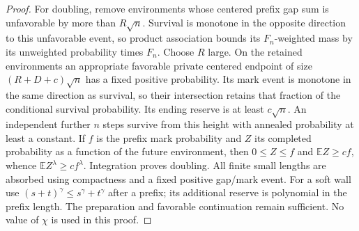 \begin{proof}
For doubling, remove environments whose centered prefix gap sum is
unfavorable by more than $R\sqrt n$. Survival is monotone in the opposite
direction to this unfavorable event, so product association bounds its
$F_n$-weighted mass by its unweighted probability times $F_n$.
Choose $R$ large. On the retained environments an appropriate favorable
private centered endpoint of size $(R+D+c)\sqrt n$ has a fixed positive
probability. Its mark event is monotone in the same direction as survival,
so their intersection retains that fraction of the conditional survival
probability. Its ending reserve is at least $c\sqrt n$.
An independent further $n$ steps survive from this height with annealed
probability at least a constant. If $f$ is the prefix mark probability
and $Z$ its completed probability as a function of the future environment,
then $0\le Z\le f$ and $\mathbb E Z\ge cf$, whence
$\mathbb E Z^\lambda\ge cf^\lambda$. Integration proves doubling.
All finite small lengths are absorbed using compactness and a fixed
positive gap/mark event. For a soft wall use
$(s+t)^\gamma\le s^\gamma+t^\gamma$ after a prefix; its additional reserve
is polynomial in the prefix length. The preparation and favorable
continuation remain sufficient. No value of $\chi$ is used in this proof.
\end{proof}

